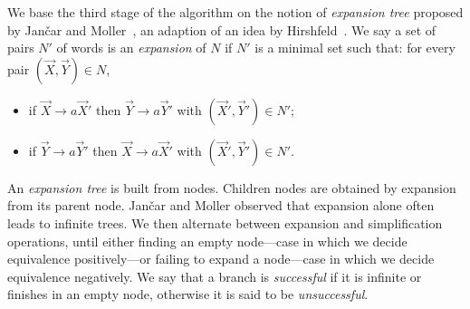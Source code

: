 We base the third stage of the algorithm on the notion of
\emph{expansion tree} proposed by Jan{\v{c}}ar and
Moller~\cite{janvcar1999techniques}, an adaption of an idea by
Hirshfeld~\cite{hirshfeld1996bisimulation}. We say a set of pairs $N'$
of words is an \emph{expansion} of $N$ if $N'$ is a minimal set such
that: for every pair $(\vec X, \vec Y) \in N$,
\begin{itemize}
\item if $\vec X \rightarrow a\vec X'$ then
  $\vec Y \rightarrow a\vec Y'$ with $(\vec X',\vec Y')\in N'$;
\item if $\vec Y \rightarrow a\vec Y'$ then
  $\vec X \rightarrow a \vec X'$ with $(\vec X',\vec Y')\in N'$.
\end{itemize}

An \emph{expansion tree} is built from nodes. Children nodes are
obtained by expansion from its parent node. Jan{\v{c}}ar and Moller
observed that expansion alone often leads to infinite trees. We then
alternate between expansion and simplification operations, until
either finding an empty node---case in which we decide equivalence
positively---or failing to expand a node---case in which we decide
equivalence negatively.
%
%
We say that a branch is \emph{successful} if it is infinite or
finishes in an empty node, otherwise it is said to be
\emph{unsuccessful}.

